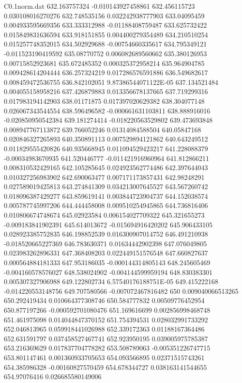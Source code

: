 \begin{filecontents}{C0.1norm.dat}
632.163757324		-0.010143927458861
632.456115723		0.030108016270276
632.748535156		0.032242938777903
633.04095459		0.004933595669356
633.333312988		-0.01188408759487
633.625732422		0.015849831636594
633.918151855		0.004400279354489
634.210510254		0.015257748352015
634.502929688		-0.00754660335617
634.795349121		-0.011523190419592
635.08770752		0.006082689560662
635.380126953		0.00715852923681
635.672485352		0.000325372958214
635.964904785		0.009428614204444
636.257324219		0.017286576591886
636.549682617		0.008459472536755
636.842102051		9.87386544071122E-05
637.134521484		0.004055158958216
637.426879883		0.013356678137665
637.719299316		0.017983194142903
638.01171875		0.017397020629382
638.304077148		0.026067343544554
638.596496582		-0.000661631103811
638.888916016		-0.020850950542384
639.181274414		-0.018220563529802
639.473693848		0.008947767113872
639.766052246		0.01314084588504
640.05847168		0.020846327265893
640.350891113		0.007529894121862
640.643249512		0.011829555420826
640.935668945		0.011094529423217
641.228088379		-0.00034983670935
641.520446777		-0.011421916960964
641.812866211		0.008310532429165
642.105285645		0.024923562774486
642.397644043		0.010327256983902
642.690063477		0.007171173857431
642.98248291		0.027589019425813
643.274841309		0.034213007645527
643.567260742		0.018096387429277
643.859619141		0.003844723904737
644.152038574		0.005787745997206
644.444458008		0.009510254945865
644.736816406		0.010806674748674
645.02923584		0.006154027709322
645.321655273		-0.009183841902391
645.614013672		-0.015694916420202
645.906433105		0.028923385752835
646.198852539		0.016300907014752
646.491210938		-0.018520665227369
646.783630371		0.01634442902398
647.076049805		0.023983262896331
647.368408203		0.022449151576548
647.660827637		0.000564884181333
647.953186035		-0.000144314805143
648.245605469		-0.004160578576027
648.538024902		-0.004144599959194
648.830383301		0.005307327906988
649.122802734		6.57540176188751E-05
649.415222168		-0.014220553148756
649.707580566		-0.007072467816482
650		0.009040066513265
650.292419434		0.010664377308746
650.584777832		0.00509776452954
650.877197266		-0.000592701080476
651.169616699		0.002856998468748
651.461975098		0.014044847370152
651.754394531		0.028032991733292
652.046813965		0.059918441026988
652.339172363		0.01188167364486
652.631591797		0.037458527467741
652.923950195		0.039005975785387
653.216369629		0.017837704778282
653.508789063		-0.005351226747715
653.801147461		0.001360933705653
654.093566895		0.02371515743261
654.385986328		-0.00160827570459
654.678344727		0.038163141544655
654.97076416		0.026685580149006

\end{filecontents}
